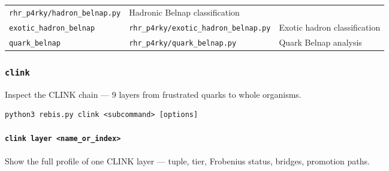 \begin{longtable}[]{@{}lll@{}}
\begin{minipage}[t]{0.24\columnwidth}
\texttt{rhr\_p4rky/hadron\_belnap.py}\strut
\end{minipage} & \begin{minipage}[t]{0.43\columnwidth}\raggedright
Hadronic Belnap classification\strut
\end{minipage}\tabularnewline
\begin{minipage}[t]{0.24\columnwidth}\raggedright
\texttt{exotic\_hadron\_belnap}\strut
\end{minipage} & \begin{minipage}[t]{0.24\columnwidth}\raggedright
\texttt{rhr\_p4rky/exotic\_hadron\_belnap.py}\strut
\end{minipage} & \begin{minipage}[t]{0.43\columnwidth}\raggedright
Exotic hadron classification\strut
\end{minipage}\tabularnewline
\begin{minipage}[t]{0.24\columnwidth}\raggedright
\texttt{quark\_belnap}\strut
\end{minipage} & \begin{minipage}[t]{0.24\columnwidth}\raggedright
\texttt{rhr\_p4rky/quark\_belnap.py}\strut
\end{minipage} & \begin{minipage}[t]{0.43\columnwidth}\raggedright
Quark Belnap analysis\strut
\end{minipage}\tabularnewline
\bottomrule
\end{longtable}

\hypertarget{clink}{%
\subsubsection{\texorpdfstring{\texttt{clink}}{clink}}\label{clink}}

Inspect the CLINK chain --- 9 layers from frustrated quarks to whole
organisms.

\begin{verbatim}
python3 rebis.py clink <subcommand> [options]
\end{verbatim}

\hypertarget{clink-layer-name_or_index}{%
\paragraph{\texorpdfstring{\texttt{clink\ layer\ \textless{}name\_or\_index\textgreater{}}}{clink layer \textless name\_or\_index\textgreater{}}}\label{clink-layer-name_or_index}}

Show the full profile of one CLINK layer --- tuple, tier, Frobenius
status, bridges, promotion paths.

